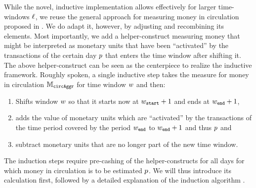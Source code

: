 While the novel, inductive implementation allows effectively for larger time-windows \({\ell}\), we reuse the general approach for measuring money in circulation proposed in \cite{pernice2019cryptocurrencies}. %
We do adapt it, however, by adjusting and recombining its elements. %
Most importantly, we add a helper-construct measuring money that might be interpreted as monetary units that have been ``activated'' by the transactions of the certain day \( {p} \) that enters the time window after shifting it. %
The above helper-construct can be seen as the centerpiece to realize the inductive framework.
Roughly spoken, a single inductive step takes the measure for money in circulation \( {\mathbb{M}_{\mathtt{circAggr}}} \) for time window \({w}\) and then: %
\begin{enumerate}
\item Shifts window \({w}\) so that it starts now at \({w}_{{\mathtt{start}}} + 1\) and ends at \({w}_{{\mathtt{end}}} + 1\),
\item adds the value of monetary units which are ``activated'' by the transactions of the time period covered by the period \({w}_{{\mathtt{end}}}\) to \({w}_{{\mathtt{end}}} + 1\) and thus \({p}\) and %
\item subtract monetary units that are no longer part of the new time window. %
\end{enumerate}
The induction steps require pre-cashing of the helper-constructs for all days for which money in circulation is to be estimated \({p}\). %
We will thus introduce its calculation first, followed by a detailed explanation of the induction algorithm . %




